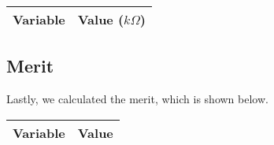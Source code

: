 \vspace{0.4cm}

\begin{center}
\begin{tabular}{|l|r|}
  \hline    
  {\bf Variable} & {\bf Value ($k\Omega$)} \\ \hline
  
\end{tabular}
\end{center}

\vspace{0.4cm}



\subsection{Merit}

Lastly, we calculated the merit, which is shown below.

\vspace{0.4cm}

\begin{center}
\begin{tabular}{|l|r|}
  \hline    
  {\bf Variable} & {\bf Value} \\ \hline
  
\end{tabular}
\end{center}